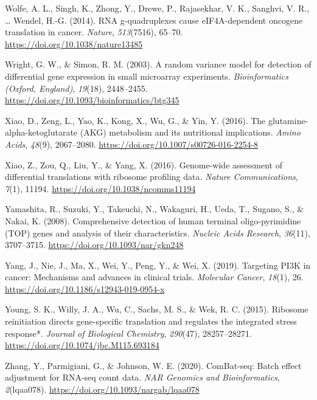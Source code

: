 \documentclass[12pt,openany]{book}
\begin{document}
\hypertarget{ref-Wolfe2014}{}
Wolfe, A. L., Singh, K., Zhong, Y., Drewe, P., Rajasekhar, V. K.,
Sanghvi, V. R., \ldots{} Wendel, H.-G. (2014). RNA g-quadruplexes cause
eIF4A-dependent oncogene translation in cancer. \emph{Nature},
\emph{513}(7516), 65--70. \url{https://doi.org/10.1038/nature13485}

\hypertarget{ref-Wright2003}{}
Wright, G. W., \& Simon, R. M. (2003). A random variance model for
detection of differential gene expression in small microarray
experiments. \emph{Bioinformatics (Oxford, England)}, \emph{19}(18),
2448--2455. \url{https://doi.org/10.1093/bioinformatics/btg345}

\hypertarget{ref-Xiao2016a}{}
Xiao, D., Zeng, L., Yao, K., Kong, X., Wu, G., \& Yin, Y. (2016). The
glutamine-alpha-ketoglutarate (AKG) metabolism and its nutritional
implications. \emph{Amino Acids}, \emph{48}(9), 2067--2080.
\url{https://doi.org/10.1007/s00726-016-2254-8}

\hypertarget{ref-Xiao2016}{}
Xiao, Z., Zou, Q., Liu, Y., \& Yang, X. (2016). Genome-wide assessment
of differential translations with ribosome profiling data. \emph{Nature
Communications}, \emph{7}(1), 11194.
\url{https://doi.org/10.1038/ncomms11194}

\hypertarget{ref-Yamashita2008}{}
Yamashita, R., Suzuki, Y., Takeuchi, N., Wakaguri, H., Ueda, T., Sugano,
S., \& Nakai, K. (2008). Comprehensive detection of human terminal
oligo-pyrimidine (TOP) genes and analysis of their characteristics.
\emph{Nucleic Acids Research}, \emph{36}(11), 3707--3715.
\url{https://doi.org/10.1093/nar/gkn248}

\hypertarget{ref-Yang2019}{}
Yang, J., Nie, J., Ma, X., Wei, Y., Peng, Y., \& Wei, X. (2019).
Targeting PI3K in cancer: Mechanisms and advances in clinical trials.
\emph{Molecular Cancer}, \emph{18}(1), 26.
\url{https://doi.org/10.1186/s12943-019-0954-x}

\hypertarget{ref-Young2015}{}
Young, S. K., Willy, J. A., Wu, C., Sachs, M. S., \& Wek, R. C. (2015).
Ribosome reinitiation directs gene-specific translation and regulates
the integrated stress response*. \emph{Journal of Biological Chemistry},
\emph{290}(47), 28257--28271.
\url{https://doi.org/10.1074/jbc.M115.693184}

\hypertarget{ref-Zhang2020}{}
Zhang, Y., Parmigiani, G., \& Johnson, W. E. (2020). ComBat-seq: Batch
effect adjustment for RNA-seq count data. \emph{NAR Genomics and
Bioinformatics}, \emph{2}(lqaa078).
\url{https://doi.org/10.1093/nargab/lqaa078}
\end{document}
